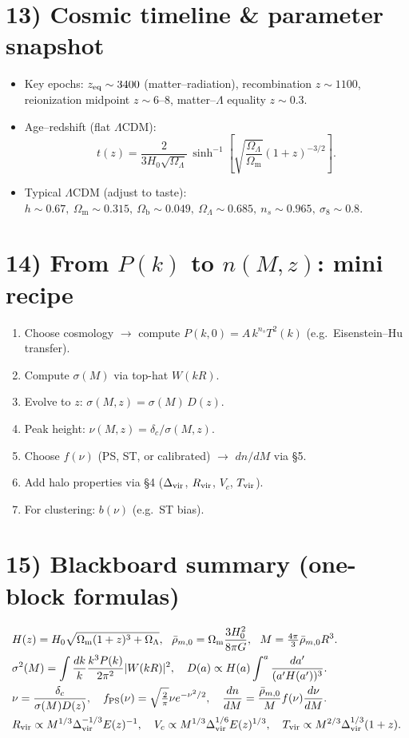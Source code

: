 \documentclass[11pt,a4paper]{article}
\newcommand{\Hnot}{H_0}
\newcommand{\hubble}{h}
\newcommand{\Omm}{\Omega_{\mathrm m}}
\newcommand{\Omb}{\Omega_{\mathrm b}}
\newcommand{\Oml}{\Omega_{\Lambda}}
\newcommand{\ns}{n_s}
\newcommand{\sigEight}{\sigma_8}
\begin{document}
\section*{13) Cosmic timeline \& parameter snapshot}
\begin{itemize}
\item Key epochs: $z_{\rm eq}\sim 3400$ (matter–radiation), recombination $z\sim 1100$, 
reionization midpoint $z\sim 6$--8, matter–$\Lambda$ equality $z\sim 0.3$.
\item Age–redshift (flat $\Lambda$CDM):
\[
t(z)=\frac{2}{3\Hnot\sqrt{\Oml}}\,
\sinh^{-1}\!\left[\sqrt{\frac{\Oml}{\Omm}}(1+z)^{-3/2}\right].
\]
\item Typical $\Lambda$CDM (adjust to taste): 
$\hubble\sim 0.67,\ \Omm\sim 0.315,\ \Omb\sim 0.049,\ \Oml\sim 0.685,\ \ns\sim 0.965,\ \sigEight\sim 0.8$.
\end{itemize}

\section*{14) From $P(k)$ to $n(M,z)$: mini recipe}
\begin{enumerate}[leftmargin=*]
\item Choose cosmology $\to$ compute $P(k,0)=A\,k^{\ns}T^2(k)$ (e.g.\ Eisenstein--Hu transfer).
\item Compute $\sigma(M)$ via top-hat $W(kR)$.
\item Evolve to $z$: $\sigma(M,z)=\sigma(M)\,D(z)$.
\item Peak height: $\nu(M,z)=\delta_c/\sigma(M,z)$.
\item Choose $f(\nu)$ (PS, ST, or calibrated) $\to$ $dn/dM$ via \S5.
\item Add halo properties via \S4 ($\Delta_{\rm vir}$, $R_{\rm vir}$, $V_c$, $T_{\rm vir}$).
\item For clustering: $b(\nu)$ (e.g.\ ST bias).
\end{enumerate}

\section*{15) Blackboard summary (one-block formulas)}
\[
\begin{aligned}
&H(z)=\Hnot\sqrt{\Omm(1+z)^3+\Oml},\ \
\bar\rho_{m,0}=\Omm\frac{3\Hnot^2}{8\pi G},\ \
M=\tfrac{4\pi}{3}\bar\rho_{m,0}R^3.\\
&\sigma^2(M)=\int \frac{dk}{k}\frac{k^3P(k)}{2\pi^2}|W(kR)|^2,\quad
D(a)\propto H(a)\int^a\frac{da'}{(a'H(a'))^3}.\\
&\nu=\frac{\delta_c}{\sigma(M)D(z)},\quad 
f_{\rm PS}(\nu)=\sqrt{\tfrac{2}{\pi}}\nu e^{-\nu^2/2},\quad
\frac{dn}{dM}=\frac{\bar\rho_{m,0}}{M} f(\nu)\frac{d\nu}{dM}.\\
&R_{\rm vir}\propto M^{1/3}\Delta_{\rm vir}^{-1/3}E(z)^{-1},\quad
V_c\propto M^{1/3}\Delta_{\rm vir}^{1/6}E(z)^{1/3},\quad
T_{\rm vir}\propto M^{2/3}\Delta_{\rm vir}^{1/3}(1+z).
\end{aligned}
\]
\end{document}
